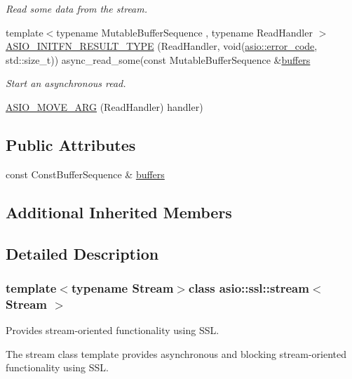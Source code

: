 \begin{DoxyCompactItemize}
\begin{DoxyCompactList}\small\item\em Read some data from the stream. \end{DoxyCompactList}\item 
{\footnotesize template$<$typename Mutable\+Buffer\+Sequence , typename Read\+Handler $>$ }\\\hyperlink{classasio_1_1ssl_1_1stream_a1effcde5ae6cbeeb8c4851c2f7bc1b55}{A\+S\+I\+O\+\_\+\+I\+N\+I\+T\+F\+N\+\_\+\+R\+E\+S\+U\+L\+T\+\_\+\+T\+Y\+P\+E} (Read\+Handler, void(\hyperlink{classasio_1_1error__code}{asio\+::error\+\_\+code}, std\+::size\+\_\+t)) async\+\_\+read\+\_\+some(const Mutable\+Buffer\+Sequence \&\hyperlink{classasio_1_1ssl_1_1stream_aefa76c1cfe5178bd3e49d3fe06272133}{buffers}
\begin{DoxyCompactList}\small\item\em Start an asynchronous read. \end{DoxyCompactList}\item 
\hyperlink{classasio_1_1ssl_1_1stream_ad7381ab81523347e987426ac0e60534c}{A\+S\+I\+O\+\_\+\+M\+O\+V\+E\+\_\+\+A\+R\+G} (Read\+Handler) handler)
\end{DoxyCompactItemize}
\subsection*{Public Attributes}
\begin{DoxyCompactItemize}
\item 
const Const\+Buffer\+Sequence \& \hyperlink{classasio_1_1ssl_1_1stream_aefa76c1cfe5178bd3e49d3fe06272133}{buffers}
\end{DoxyCompactItemize}
\subsection*{Additional Inherited Members}


\subsection{Detailed Description}
\subsubsection*{template$<$typename Stream$>$class asio\+::ssl\+::stream$<$ Stream $>$}

Provides stream-\/oriented functionality using S\+S\+L. 

The stream class template provides asynchronous and blocking stream-\/oriented functionality using S\+S\+L.

